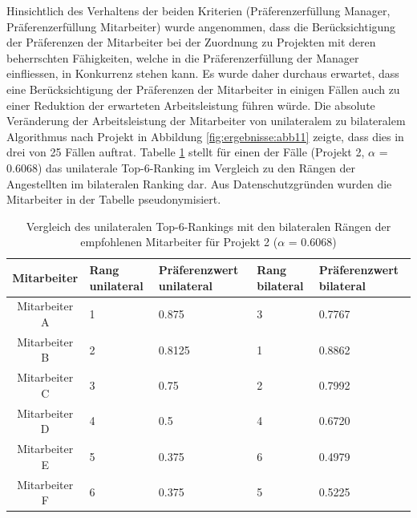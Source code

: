 Hinsichtlich des Verhaltens der beiden Kriterien (Präferenzerfüllung Manager, Präferenzerfüllung Mitarbeiter) wurde angenommen, dass die Berücksichtigung der Präferenzen der Mitarbeiter bei der Zuordnung zu Projekten mit deren beherrschten Fähigkeiten, welche in die Präferenzerfüllung der Manager einfliessen, in Konkurrenz stehen kann.
Es wurde daher durchaus erwartet, dass eine Berücksichtigung der Präferenzen der Mitarbeiter in einigen Fällen auch zu einer Reduktion der erwarteten Arbeitsleistung führen würde.
Die absolute Veränderung der Arbeitsleistung der Mitarbeiter von unilateralem zu bilateralem Algorithmus nach Projekt in Abbildung \ref{fig:ergebnisse:abb11} zeigte, dass dies in drei von 25 Fällen auftrat.
Tabelle \ref{tab:diskussion:tab2} stellt für einen der Fälle (Projekt 2, $\alpha$ = 0.6068) das unilaterale Top-6-Ranking im Vergleich zu den Rängen der Angestellten im bilateralen Ranking dar.
Aus Datenschutzgründen wurden die Mitarbeiter in der Tabelle pseudonymisiert.

\begin{table}[htbp]
    \begin{center}
    \begin{tabular}{c|p{0.7in}|p{0.95in}|p{0.7in}|p{0.95in}}
    {\textbf{Mitarbeiter}} & {\textbf{Rang unilateral}} & {\textbf{Präferenzwert unilateral}} & {\textbf{Rang bilateral}} & {\textbf{Präferenzwert bilateral}} \\
    \hline
	Mitarbeiter A & \hfil1 & \hfil0.875 & \hfil3 & \hfil0.7767 \\
    \hline
    Mitarbeiter B & \hfil2 & \hfil0.8125 & \hfil1 & \hfil0.8862 \\
    \hline
	Mitarbeiter C & \hfil3 & \hfil0.75 & \hfil2 & \hfil0.7992 \\
    \hline
	Mitarbeiter D & \hfil4 & \hfil0.5 & \hfil4 & \hfil0.6720 \\
    \hline
	Mitarbeiter E & \hfil5 & \hfil0.375 & \hfil6 & \hfil0.4979 \\
    \hline
	Mitarbeiter F & \hfil6 & \hfil0.375 & \hfil5 & \hfil0.5225 \\
    \end{tabular}
    \end{center}
    \caption[Vergleich des unilateralen Top-6-Rankings mit den bilateralen Rängen der empfohlenen Mitarbeiter für Projekt 2 ($\alpha$ = 0.6068)]{Vergleich des unilateralen Top-6-Rankings mit den bilateralen Rängen der empfohlenen Mitarbeiter für Projekt 2 ($\alpha$ = 0.6068)}
	\label{tab:diskussion:tab2}
\end{table}

